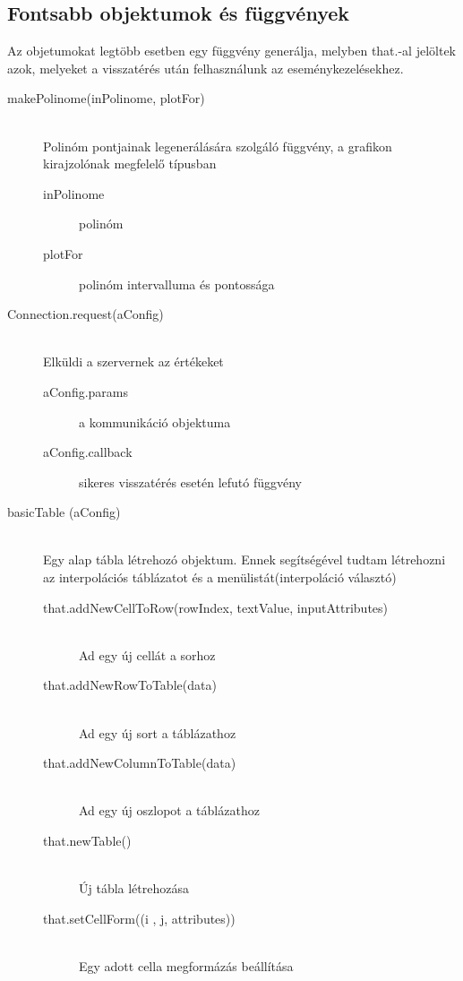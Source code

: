 \documentclass{elteikthesis}
\begin{document}
\subsection{Fontsabb objektumok és függvények}
	\hfill
	Az objetumokat legtöbb esetben egy függvény generálja, melyben that.-al jelöltek azok, melyeket a visszatérés után felhasználunk az eseménykezelésekhez.
	\begin{description}
		\item[makePolinome(inPolinome, plotFor)] 
			\hfill \\ 
			Polinóm pontjainak legenerálására szolgáló függvény, a grafikon kirajzolónak megfelelő típusban
			\begin{description}
			\item[inPolinome] polinóm
			\item[plotFor] polinóm intervalluma és pontossága
			\end{description}
		\item[Connection.request(aConfig)] 
			\hfill \\ 
			Elküldi a szervernek az értékeket
			\begin{description}
			\item[aConfig.params] a kommunikáció objektuma
			\item[aConfig.callback] sikeres visszatérés esetén lefutó függvény
			\end{description}
		\item[basicTable (aConfig)]
			\hfill \\ 
			Egy alap tábla létrehozó objektum. Ennek segítségével tudtam létrehozni az interpolációs táblázatot és a menülistát(interpoláció választó)
			\begin{description}
			\item[that.addNewCellToRow(rowIndex, textValue, inputAttributes)] 
				\hfill \\  Ad egy új cellát a sorhoz
			\item[that.addNewRowToTable(data)]
				\hfill \\ Ad egy új sort a táblázathoz
			\item[that.addNewColumnToTable(data)]
				\hfill \\ Ad egy új oszlopot a táblázathoz
			\item[that.newTable()] 
				\hfill \\ Új tábla létrehozása
			\item[that.setCellForm((i , j, attributes))] 
				\hfill \\ Egy adott cella megformázás beállítása

\end{description}
\end{description}
\end{document}
